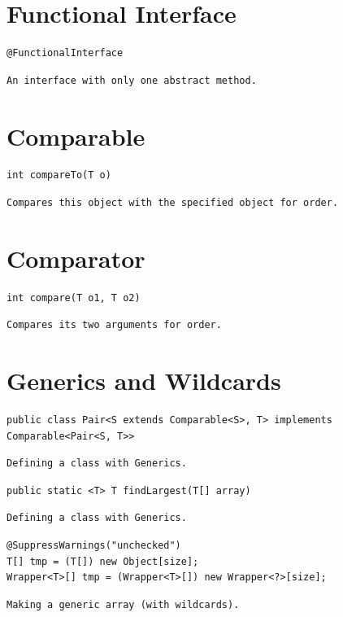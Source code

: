 \documentclass[5pt, portrait]{article}
\begin{document}
\section{Functional Interface}
\begin{verbatim}
@FunctionalInterface
\end{verbatim}
\begin{verbatim}
An interface with only one abstract method.
\end{verbatim}



\section{Comparable}
\begin{verbatim}
int compareTo(T o)
\end{verbatim}
\begin{verbatim}
Compares this object with the specified object for order.
\end{verbatim}

\section{Comparator}
\begin{verbatim}
int compare(T o1, T o2)
\end{verbatim}
\begin{verbatim}
Compares its two arguments for order.
\end{verbatim}

\section{Generics and Wildcards}
\begin{verbatim}
public class Pair<S extends Comparable<S>, T> implements Comparable<Pair<S, T>>
\end{verbatim}
\begin{verbatim}
Defining a class with Generics.
\end{verbatim}

\begin{verbatim}
public static <T> T findLargest(T[] array)
\end{verbatim}
\begin{verbatim}
Defining a class with Generics.
\end{verbatim}

\begin{verbatim}
@SuppressWarnings("unchecked")
T[] tmp = (T[]) new Object[size];
Wrapper<T>[] tmp = (Wrapper<T>[]) new Wrapper<?>[size];
\end{verbatim}
\begin{verbatim}
Making a generic array (with wildcards).
\end{verbatim}
\end{document}
